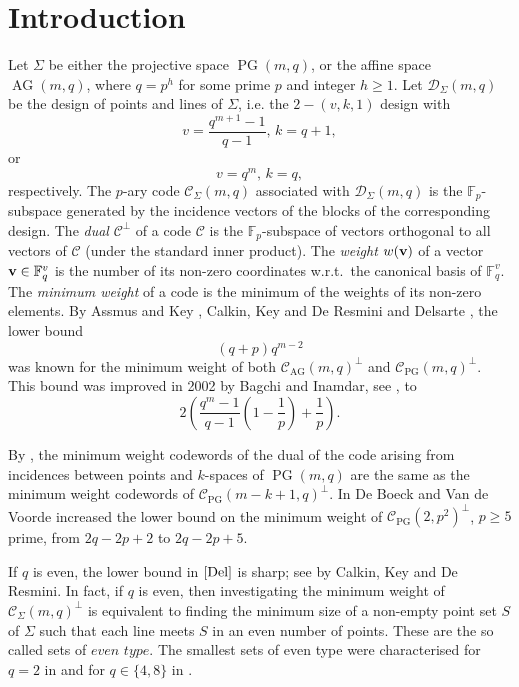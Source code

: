 \documentclass[12pt]{article}
\newcommand{\cC}{{\mathcal C}}
\newcommand{\cD}{{\mathcal D}}
\newcommand{\F}{{\mathbb F}}
\DeclareMathOperator{\PG}{{PG}}
\DeclareMathOperator{\AG}{{AG}}
\begin{document}
	
	
	\section{Introduction}
	\label{intro}
	
	Let $\Sigma$ be either the projective space $\PG(m,q)$, or the affine space $\AG(m,q)$, where $q=p^h$ for some prime $p$ and integer $h \geq 1$.
	Let $\cD_{\Sigma}(m,q)$ be the design of points and lines of $\Sigma$, i.e. the $2-(v, k, 1)$ design with 
	\[v = \frac{q^{m+1}-1}{q-1},\, k=q+1,\] 
	or \[v = q^m,\, k=q,\] respectively. 
	The $p$-ary code $\cC_{\Sigma}(m,q)$ associated with $\cD_{\Sigma}(m,q)$ is the $\F_p$-subspace generated by the incidence vectors of the blocks of the corresponding design. The \textit{dual} $\cC^\perp$ of a code $\cC$ is the $\F_p$-subspace of vectors orthogonal to all vectors of $\cC$ (under the standard inner product).
	The \textit{weight} $w({\bf v})$ of a vector ${\bf v}\in \F_q^v$ is the number of its non-zero coordinates w.r.t.\ the canonical basis of $\F_q^v$. The \textit{minimum weight} of a code is the minimum of the weights of its non-zero elements. 
	By Assmus and Key \cite[Theorem 5.7.9]{AssmusKey}, Calkin, Key and De Resmini \cite[Proposition 1]{DeResmini} and Delsarte \cite{Delsarte}, the lower bound 
	\begin{equation}
		\label{Del}
		(q+p)q^{m-2}
	\end{equation}
	was known for the minimum weight of both $\cC_{\AG}(m,q)^\perp$ and $\cC_{\PG}(m,q)^\perp$. This bound was improved in 2002 by Bagchi and Inamdar, see \cite[Theorem 3]{BagchiInamdar}, to
	\[2\left (\frac{q^{m}-1}{q-1}\left (1-\frac{1}{p} \right )+\frac{1}{p} \right ).\]
	
	
	By \cite[Theorems 10 and 11]{LaStoVan}, the minimum weight codewords of the dual of the code arising from incidences between points and $k$-spaces of $\PG(m,q)$ are the same as the minimum weight codewords of $\cC_{\PG}(m-k+1,q)^\perp$. 
	In \cite[Corollary 1.5]{deboeckvan} De Boeck and Van de Voorde  increased the lower bound on the minimum weight of $\cC_{\PG}(2,p^2)^\perp$, $p \geq 5$ prime, from $2q-2p+2$ to $2q-2p+5$.
	
	If $q$ is even, the lower bound in $\eqref{Del}$ is sharp; see \cite[Corollary 1]{DeResmini} by Calkin, Key and De Resmini.
	In fact, if $q$ is even, then investigating the minimum weight of $\mathcal{C}_{\Sigma}(m, q)^\perp$ is equivalent to finding the minimum size of a non-empty point set $S$ of $\Sigma$ such that each line meets $S$ in an even number of points. These are the so called sets of $\textit{even type}$. The smallest sets of even type were characterised for $q=2$ in \cite[Proposition 3]{BagchiInamdar} and for $q\in \{4,8\}$ in \cite{adriaensen}. 
	
\end{document}
